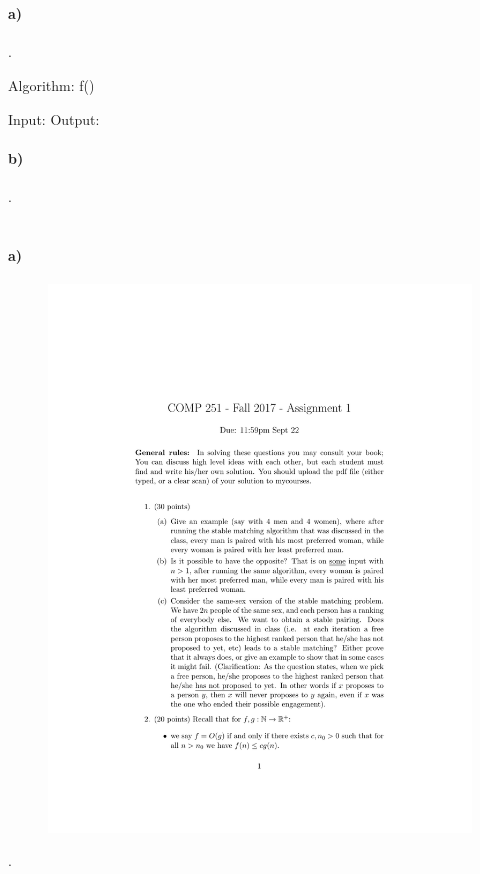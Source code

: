 \documentclass[11pt,letterpaper]{article}
\begin{document}
		
	\section{}
	
		\paragraph{a)}
		.
		\begin{center}
		Algorithm: f()
		\end{center}
		\begin{algorithm}[caption={}, label={alg3}]
Input: 
Output: 


		\end{algorithm}
		
		\paragraph{b)}
		.
		
	\section{}
	
		\paragraph{a)}
		\begin{figure}[h]
			\centering
			\includegraphics[width=\textwidth]{hw1.pdf}
		\end{figure}
	.
		
\end{document}
